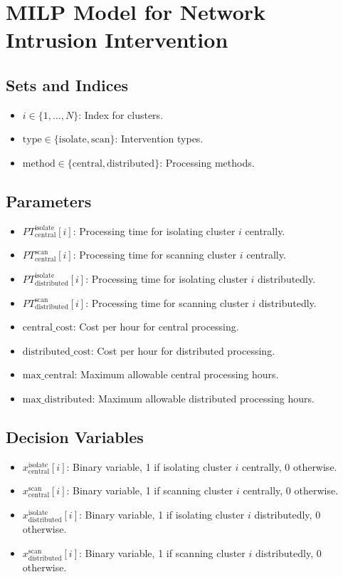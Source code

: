 \documentclass{article}
\begin{document}
\section*{MILP Model for Network Intrusion Intervention}

\subsection*{Sets and Indices}
\begin{itemize}
    \item $i \in \{1, \ldots, N\}$: Index for clusters.
    \item $\text{type} \in \{\text{isolate}, \text{scan}\}$: Intervention types.
    \item $\text{method} \in \{\text{central}, \text{distributed}\}$: Processing methods.
\end{itemize}

\subsection*{Parameters}
\begin{itemize}
    \item $PT_{\text{central}}^{\text{isolate}}[i]$: Processing time for isolating cluster $i$ centrally.
    \item $PT_{\text{central}}^{\text{scan}}[i]$: Processing time for scanning cluster $i$ centrally.
    \item $PT_{\text{distributed}}^{\text{isolate}}[i]$: Processing time for isolating cluster $i$ distributedly.
    \item $PT_{\text{distributed}}^{\text{scan}}[i]$: Processing time for scanning cluster $i$ distributedly.
    \item $\text{central\_cost}$: Cost per hour for central processing.
    \item $\text{distributed\_cost}$: Cost per hour for distributed processing.
    \item $\text{max\_central}$: Maximum allowable central processing hours.
    \item $\text{max\_distributed}$: Maximum allowable distributed processing hours.
\end{itemize}

\subsection*{Decision Variables}
\begin{itemize}
    \item $x_{\text{central}}^{\text{isolate}}[i]$: Binary variable, 1 if isolating cluster $i$ centrally, 0 otherwise.
    \item $x_{\text{central}}^{\text{scan}}[i]$: Binary variable, 1 if scanning cluster $i$ centrally, 0 otherwise.
    \item $x_{\text{distributed}}^{\text{isolate}}[i]$: Binary variable, 1 if isolating cluster $i$ distributedly, 0 otherwise.
    \item $x_{\text{distributed}}^{\text{scan}}[i]$: Binary variable, 1 if scanning cluster $i$ distributedly, 0 otherwise.
\end{itemize}
\end{document}
